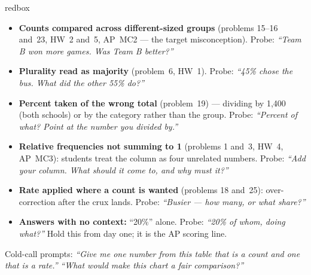 \documentclass[10pt]{article}
\begin{document}
\boxguard
\begin{skillbox}{redbox}
\begin{itemize}[leftmargin=1.2em, nosep]
  \item \textbf{Counts compared across different-sized groups} (problems 15--16 and~23, HW~2
        and~5, AP~MC2 --- the target misconception). Probe: \emph{``Team B won more games. Was
        Team B better?''}
  \item \textbf{Plurality read as majority} (problem~6, HW~1). Probe: \emph{``45\% chose the
        bus. What did the other 55\% do?''}
  \item \textbf{Percent taken of the wrong total} (problem~19) --- dividing by 1,400 (both
        schools) or by the category rather than the group. Probe: \emph{``Percent \emph{of
        what}? Point at the number you divided by.''}
  \item \textbf{Relative frequencies not summing to 1} (problems 1 and~3, HW~4, AP~MC3):
        students treat the column as four unrelated numbers. Probe: \emph{``Add your column.
        What should it come to, and why must it?''}
  \item \textbf{Rate applied where a count is wanted} (problems 18 and~25): over-correction
        after the crux lands. Probe: \emph{``Busier --- how many, or what share?''}
  \item \textbf{Answers with no context:} ``20\%'' alone. Probe: \emph{``20\% of whom, doing
        what?''} Hold this from day one; it is the AP scoring line.
\end{itemize}
Cold-call prompts: \emph{``Give me one number from this table that is a count and one that is a
rate.''} \quad \emph{``What would make this chart a fair comparison?''}
\end{skillbox}
\end{document}
